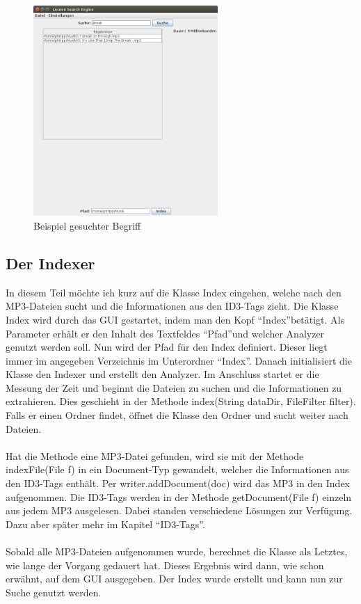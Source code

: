 \documentclass[12pt,a4paper,ngerman]{report}
\begin{document}
\begin{figure}[h!]
\centering
\includegraphics[width=7cm]{img/Lucene_Search_Engine_2.png}
\caption{Beispiel gesuchter Begriff\protect\footnotemark}
\end{figure}
\subsection*{Der Indexer}
In diesem Teil möchte ich kurz auf die Klasse Index eingehen, welche nach den MP3-Dateien sucht und die Informationen aus den ID3-Tags zieht. Die Klasse Index wird durch das GUI gestartet, indem man den Kopf \textquotedblleft Index\textquotedblright betätigt. Als Parameter erhält er den Inhalt des Textfeldes \textquotedblleft Pfad\textquotedblright und welcher Analyzer genutzt werden soll. Nun wird der Pfad für den Index definiert. Dieser liegt immer im angegeben Verzeichnis im Unterordner \textquotedblleft Index\textquotedblright . Danach initialisiert die Klasse den Indexer und erstellt den Analyzer. Im Anschluss startet er die Messung der Zeit und beginnt die Dateien zu suchen und die Informationen zu extrahieren. Dies geschieht in der Methode index(String dataDir, FileFilter filter). Falls er einen Ordner findet, öffnet die Klasse den Ordner und sucht weiter nach Dateien.\\
\\
Hat die Methode eine MP3-Datei gefunden, wird sie mit der Methode indexFile(File f) in ein Document-Typ gewandelt, welcher die Informationen aus den ID3-Tags enthält. Per writer.addDocument(doc) wird das MP3 in den Index aufgenommen. Die ID3-Tags werden in der Methode getDocument(File f) einzeln aus jedem MP3 ausgelesen. Dabei standen verschiedene Lösungen zur Verfügung. Dazu aber später mehr im Kapitel \textquotedblleft ID3-Tags\textquotedblright .\\
\\
Sobald alle MP3-Dateien aufgenommen wurde, berechnet die Klasse als Letztes, wie lange der Vorgang gedauert hat. Dieses Ergebnis wird dann, wie schon erwähnt, auf dem GUI ausgegeben. Der Index wurde erstellt und kann nun zur Suche genutzt werden.
\end{document}
